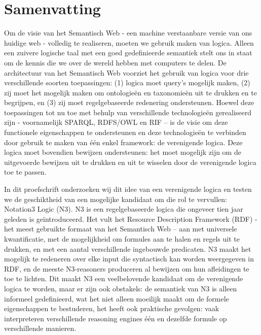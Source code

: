 \chapter{Samenvatting}\label{dutch-summary}


Om de visie van het Semantisch Web - een machine verstaanbare versie van ons huidige web - volledig
te realiseren, moeten we gebruik maken van logica. Alleen een zuivere logische taal met een goed
gedefinieerde semantiek stelt ons in staat om de kennis die we over de wereld hebben met
computers te delen. De architectuur van het Semantisch Web voorziet het gebruik van logica voor drie
verschillende soorten toepassingen: (1) logica moet query's mogelijk maken, (2) zij moet het mogelijk
maken om ontologieën en taxonomieën uit te drukken en te begrijpen, en (3) zij moet regelgebaseerde redenering ondersteunen. 
Hoewel deze toepassingen tot nu toe met
behulp van verschillende technologieën gerealiseerd zijn - voornamelijk SPARQL, RDFS/OWL en RIF
– is de visie om deze functionele eigenschappen te ondersteunen en deze technologieën te verbinden
door gebruik te maken van één enkel framework: de verenigende logica. Deze logica moet bovendien
 bewijzen ondersteunen: het moet mogelijk zijn om de uitgevoerde bewijzen uit te
drukken en uit te wisselen door de verenigende logica toe te passen.

In dit proefschrift onderzoeken wij dit idee van een verenigende logica en testen we de geschiktheid
van een mogelijke kandidaat om die rol te vervullen: Notation3 Logic (N3). N3 is een regelgebaseerde
logica die ongeveer tien jaar geleden is geïntroduceerd. Het vult het Resource Description
Framework (RDF) - het meest gebruikte formaat van het Semantisch Web – aan met universele
kwantificatie, met de mogelijkheid om formules aan te halen en regels uit te drukken, en met een
aantal verschillende ingebouwde predicaten. N3 maakt het mogelijk te redeneren over elke input die
syntactisch kan worden weergegeven in RDF, en de meeste N3-reasoners produceren al bewijzen om
hun afleidingen te toe te lichten. Dit maakt N3 een veelbelovende kandidaat om de verenigende
logica te worden, maar er zijn ook obstakels: de semantiek van N3 is alleen informeel gedefinieerd,
wat het niet alleen moeilijk maakt om de formele eigenschappen te bestuderen, het heeft ook
praktische gevolgen: vaak interpreteren verschillende reasoning engines één en dezelfde formule op
verschillende manieren.

